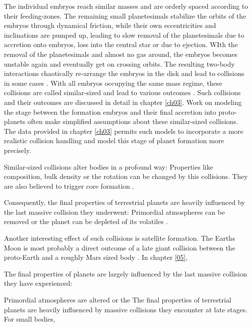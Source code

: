The individual embryos reach similar masses and are orderly spaced according to their feeding-zones. The remaining small planetesimals stabilize the orbits of the embryos through dynamical friction, while their own eccentricities and inclinations are pumped up, leading to slow removal of the planetesimals due to accretion onto embryos, loss into the central star or due to ejection. WIth the removal of the planetesimals and almost no gas around, the embryos becomes unstable again and eventually get on crossing orbits. The resulting two-body interactions chaotically re-arrange the embryos in the disk and lead to collisions in some cases \cite{Chambers:2001p2105, Chambers:2004p4098}. With all embryos occupying the same mass regime, these collisions are called similar-sized and lead to various outcomes \cite{Asphaug:2010p3539}. Such collisions and their outcomes are discussed in detail in chapter \ref{ch03}. Work on modeling the stage between the formation embryos and their final accretion into proto-planets often make simplified assumptions about these similar-sized collisions. The data provided in chapter \ref{ch03} permits such models to incorporate a more realistic collision handling and model this stage of planet formation more precisely. 

Similar-sized collisions alter bodies in a profound way: Properties like composition, bulk density \citep{Benz:1988p3336} or the rotation can be changed by this collisions. They are also believed to trigger core formation \cite{1992Icar..100..326T}. 

Consequently, the final properties of terrestrial planets are heavily influenced by the last massive collision they underwent: Primordial atmospheres can be removed \cite{2002DPS....34.2804A} or the planet can be depleted of its volatiles \citep{2001E&PSL.192..545H}.

Another interesting effect of such collisions is satellite formation. The Earths Moon is most probably a direct outcome of a late giant collision between the proto-Earth and a roughly Mars sized body \citep{1975Icar...24..504H, 1976LPI.....7..120C, 1987Icar...71...30B, Canup:2001p1861}. In chapter \ref{05}, 




The final properties of planets are largely influenced by the last massive collision they have experienced: 


Primordial atmospheres are altered \cite{2002DPS....34.2804A} or the 
The final properties of terrestrial planets are heavily influenced by massive collisions they encounter at late stages. For small bodies, 

